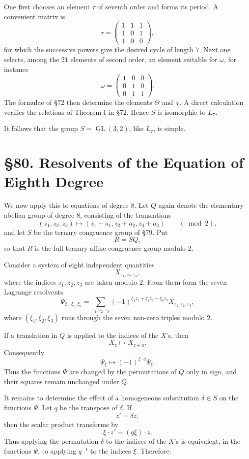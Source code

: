 \documentclass[11pt,a4paper]{book}
\newcommand{\webersection}[2]{\clearpage\section*{\S #1. #2}}
\DeclareMathOperator{\GL}{GL}
\begin{document}
One first chooses an element \(\tau\) of seventh order and forms its period.  A convenient matrix is
\[
 \tau=
 \begin{pmatrix}
 1&1&1\\
 1&0&1\\
 1&0&0
 \end{pmatrix},
\]
for which the successive powers give the desired cycle of length \(7\).  Next one selects, among the \(21\) elements of second order, an element suitable for \(\omega\), for instance
\[
 \omega=
 \begin{pmatrix}
 1&0&0\\
 0&1&0\\
 0&1&1
 \end{pmatrix}.
\]
The formulae of \S 72 then determine the elements \(\Theta\) and \(\chi\).  A direct calculation verifies the relations of Theorem I in \S 72.  Hence \(S\) is isomorphic to \(L_7\).

It follows that the group \(S=\GL(3,2)\), like \(L_7\), is simple.

\webersection{80}{Resolvents of the Equation of Eighth Degree}

We now apply this to equations of degree \(8\).  Let \(Q\) again denote the elementary abelian group of degree \(8\), consisting of the translations
\[
 (z_1,z_2,z_3)\longmapsto(z_1+a_1,z_2+a_2,z_3+a_3)
 \qquad(\bmod 2),
\]
and let \(S\) be the ternary congruence group of \S 79.  Put
\[
 R=SQ,
\]
so that \(R\) is the full ternary affine congruence group modulo \(2\).

Consider a system of eight independent quantities
\[
 X_{z_1,z_2,z_3},
\]
where the indices \(z_1,z_2,z_3\) are taken modulo \(2\).  From them form the seven Lagrange resolvents
\[
 \Psi_{\xi_1,\xi_2,\xi_3}
   =\sum_{z_1,z_2,z_3}
     (-1)^{\xi_1z_1+\xi_2z_2+\xi_3z_3}
       X_{z_1,z_2,z_3},
\]
where \((\xi_1,\xi_2,\xi_3)\) runs through the seven non-zero triples modulo \(2\).

If a translation in \(Q\) is applied to the indices of the \(X\)'s, then
\[
 X_z\longmapsto X_{z+a}.
\]
Consequently
\[
 \Psi_\xi\longmapsto
 (-1)^{\xi\cdot a}\Psi_\xi .
\]
Thus the functions \(\Psi\) are changed by the permutations of \(Q\) only in sign, and their squares remain unchanged under \(Q\).

It remains to determine the effect of a homogeneous substitution \(\delta\in S\) on the functions \(\Psi\).  Let \(q\) be the transpose of \(\delta\).  If
\[
 z'=\delta z,
\]
then the scalar product transforms by
\[
 \xi\cdot z'=(q\xi)\cdot z.
\]
Thus applying the permutation \(\delta\) to the indices of the \(X\)'s is equivalent, in the functions \(\Psi\), to applying \(q^{-1}\) to the indices \(\xi\).  Therefore:
\end{document}
